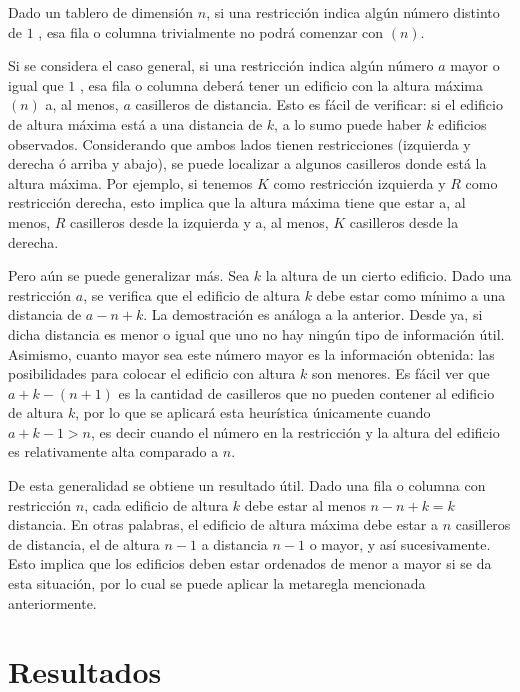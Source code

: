 \documentclass[%
	final,
	reprint,
	notitlepage,
	narroweqnarray,
	inline,
	twoside,
	invited
	]{ieee}
\begin{document}
\par Dado un tablero de dimensión $n$, si una restricción indica algún número distinto de $1$ , esa fila o columna trivialmente no podrá comenzar con $(n)$.
\par Si se considera el caso general, si una restricción indica algún número $a$ mayor o igual que $1$ , esa fila o columna deberá tener un edificio con la altura máxima $(n)$ a, al menos, $a$ casilleros de distancia. Esto es fácil de verificar: si 
el edificio de altura máxima está a una distancia de $k$, a lo sumo puede haber $k$ edificios observados. Considerando que ambos lados tienen restricciones (izquierda y derecha ó arriba y abajo), se puede localizar a algunos casilleros donde está la altura máxima. Por ejemplo, si tenemos $K$ como restricción izquierda y $R$ como restricción derecha, esto implica que la altura máxima tiene que estar a, al menos, $R$ casilleros desde la izquierda y a, al menos, $K$ casilleros desde la derecha.
\par Pero aún se puede generalizar más. Sea $k$ la altura de un cierto edificio. Dado una restricción $a$, se verifica que el edificio de altura $k$ debe estar como mínimo a una distancia de $a - n + k$. La demostración es análoga a la anterior. Desde ya, si dicha distancia es menor o igual que uno no hay ningún 
tipo de información útil. Asimismo, cuanto mayor sea este número mayor es la información obtenida: las posibilidades para colocar el edificio con altura $k$ son menores. 
Es fácil ver que $ a + k - (n + 1) $ es la cantidad de casilleros que no pueden contener al edificio de altura $k$, por lo que se aplicará esta heurística únicamente cuando $ a + k - 1 > n$, es decir cuando el número en la restricción y 
la altura del edificio es relativamente alta comparado a $n$. 
\par De esta generalidad se obtiene un resultado útil. Dado una fila o columna con restricción $n$, cada edificio de altura $k$ debe estar al menos $n - n + k = k$ distancia. En otras palabras, el edificio de altura máxima debe estar a $n$ casilleros de distancia, 
el de altura $n-1$ a distancia $n-1$ o mayor, y así sucesivamente. Esto implica que los edificios deben estar ordenados de menor a mayor si se da esta situación, por lo cual se puede aplicar la metaregla mencionada anteriormente.
\section{Resultados}
\end{document}

